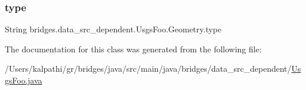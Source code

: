 \mbox{\label{classbridges_1_1data__src__dependent_1_1_usgs_foo_1_1_geometry_a985b3a46dad2fcd4e798d2f51198bcfd}} 
\subsubsection{\texorpdfstring{type}{type}}
{\footnotesize\ttfamily String bridges.\+data\+\_\+src\+\_\+dependent.\+Usgs\+Foo.\+Geometry.\+type}



The documentation for this class was generated from the following file\+:\begin{DoxyCompactItemize}
\item 
/\+Users/kalpathi/gr/bridges/java/src/main/java/bridges/data\+\_\+src\+\_\+dependent/\mbox{\hyperlink{_usgs_foo_8java}{Usgs\+Foo.\+java}}\end{DoxyCompactItemize}
